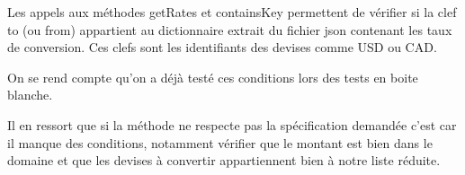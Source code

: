 \documentclass[11pt]{rapport-tp-qlm}
\begin{document}
Les appels aux méthodes getRates et containsKey permettent de vérifier si la clef to (ou from) appartient au dictionnaire extrait du fichier json contenant les taux de conversion. Ces clefs sont les identifiants des devises comme USD ou CAD.


On se rend compte qu'on a déjà testé ces conditions lors des tests en boite blanche.

Il en ressort que si la méthode ne respecte pas la spécification demandée c'est car il manque des conditions, notamment vérifier que le montant est bien dans le domaine et que les devises à convertir appartiennent bien à notre liste réduite.
\end{document}
